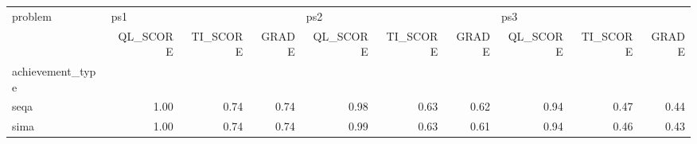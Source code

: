 \begin{tabular}{lrrrrrrrrr}
\toprule
problem & \multicolumn{3}{l}{ps1} & \multicolumn{3}{l}{ps2} & \multicolumn{3}{l}{ps3} \\
{} & QL\_SCORE & TI\_SCORE & GRADE & QL\_SCORE & TI\_SCORE & GRADE & QL\_SCORE & TI\_SCORE & GRADE \\
achievement\_type &          &          &       &          &          &       &          &          &       \\
\midrule
seqa             &     1.00 &     0.74 &  0.74 &     0.98 &     0.63 &  0.62 &     0.94 &     0.47 &  0.44 \\
sima             &     1.00 &     0.74 &  0.74 &     0.99 &     0.63 &  0.61 &     0.94 &     0.46 &  0.43 \\
\bottomrule
\end{tabular}
